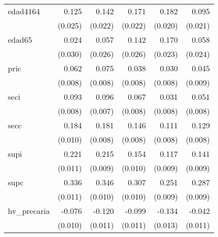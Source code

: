 {\begin{longtable}{l*{5}{D{.}{.}{-1}}}
\addlinespace
edad4164    &       0.125\sym{***}&       0.142\sym{***}&       0.171\sym{***}&       0.182\sym{***}&       0.095\sym{***}\\
            &     (0.025)         &     (0.022)         &     (0.022)         &     (0.020)         &     (0.021)         \\
\addlinespace
edad65      &       0.024         &       0.057\sym{*}  &       0.142\sym{***}&       0.170\sym{***}&       0.058\sym{*}  \\
            &     (0.030)         &     (0.026)         &     (0.026)         &     (0.023)         &     (0.024)         \\
\addlinespace
pric        &       0.062\sym{***}&       0.075\sym{***}&       0.038\sym{***}&       0.030\sym{***}&       0.045\sym{***}\\
            &     (0.008)         &     (0.008)         &     (0.008)         &     (0.008)         &     (0.009)         \\
\addlinespace
seci        &       0.093\sym{***}&       0.096\sym{***}&       0.067\sym{***}&       0.031\sym{***}&       0.051\sym{***}\\
            &     (0.008)         &     (0.007)         &     (0.008)         &     (0.008)         &     (0.008)         \\
\addlinespace
secc        &       0.184\sym{***}&       0.181\sym{***}&       0.146\sym{***}&       0.111\sym{***}&       0.129\sym{***}\\
            &     (0.010)         &     (0.008)         &     (0.008)         &     (0.008)         &     (0.008)         \\
\addlinespace
supi        &       0.221\sym{***}&       0.215\sym{***}&       0.154\sym{***}&       0.117\sym{***}&       0.141\sym{***}\\
            &     (0.011)         &     (0.009)         &     (0.010)         &     (0.009)         &     (0.009)         \\
\addlinespace
supc        &       0.336\sym{***}&       0.346\sym{***}&       0.307\sym{***}&       0.251\sym{***}&       0.287\sym{***}\\
            &     (0.011)         &     (0.010)         &     (0.010)         &     (0.009)         &     (0.009)         \\
\addlinespace
hv\_precaria &      -0.076\sym{***}&      -0.120\sym{***}&      -0.099\sym{***}&      -0.134\sym{***}&      -0.042\sym{***}\\
            &     (0.010)         &     (0.011)         &     (0.011)         &     (0.013)         &     (0.011)         \\

\end{longtable}}
